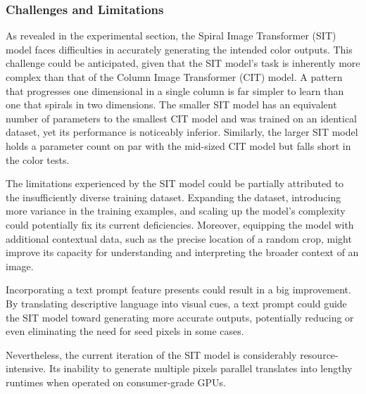     \subsubsection{Challenges and Limitations}

    As revealed in the experimental section, the Spiral Image Transformer (SIT) model faces difficulties in accurately generating the intended color outputs. This challenge could be anticipated, given that the SIT model's task is inherently more complex than that of the Column Image Transformer (CIT) model. A pattern that progresses one dimensional in a single column is far simpler to learn than one that spirals in two dimensions. The smaller SIT model has an equivalent number of parameters to the smallest CIT model and was trained on an identical dataset, yet its performance is noticeably inferior. Similarly, the larger SIT model holds a parameter count on par with the mid-sized CIT model but falls short in the color tests.

    The limitations experienced by the SIT model could be partially attributed to the insufficiently diverse training dataset. Expanding the dataset, introducing more variance in the training examples, and scaling up the model's complexity could potentially fix its current deficiencies. Moreover, equipping the model with additional contextual data, such as the precise location of a random crop, might improve its capacity for understanding and interpreting the broader context of an image.

    Incorporating a text prompt feature presents could result in a big improvement. By translating descriptive language into visual cues, a text prompt could guide the SIT model toward generating more accurate outputs, potentially reducing or even eliminating the need for seed pixels in some cases.

    Nevertheless, the current iteration of the SIT model is considerably resource-intensive. Its inability to generate multiple pixels parallel translates into lengthy runtimes when operated on consumer-grade GPUs.

